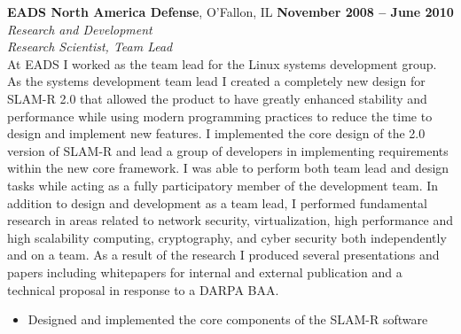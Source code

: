 \documentclass[margin,line]{resume}
\begin{document}
\begin{resume}
\textbf{EADS North America Defense}, O'Fallon, IL \hfill \textbf{November 2008 -- June 2010}\vspace{1mm}\\\vspace{1mm}%
\textit{\small{Research and Development}}\vspace{1mm}\\\vspace{0mm}%
\textsl{Research Scientist, Team Lead}\\
At EADS I worked as the team lead for the Linux systems development group. As
the systems development team lead I created a completely new design for SLAM-R
2.0 that allowed the product to have greatly enhanced stability and performance
while using modern programming practices to reduce the time to design and
implement new features.  I implemented the core design of the 2.0 version of
SLAM-R and lead a group of developers in implementing requirements within the
new core framework. I was able to perform both team lead and design tasks while
acting as a fully participatory member of the development team. In addition to
design and development as a team lead, I performed fundamental research in
areas related to network security, virtualization, high performance and high
scalability computing, cryptography, and cyber security both independently and on
a team. As a result of the research I produced several presentations and papers
including whitepapers for internal and external publication and a technical
proposal in response to a DARPA BAA.
\vspace{1mm}\\\vspace{0mm}
\begin{itemize}
\item Designed and implemented the core components of the SLAM-R software

\end{itemize}
\end{resume}
\end{document}
